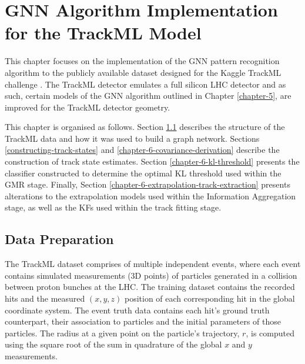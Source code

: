 


\chapter{GNN Algorithm Implementation for the TrackML Model}
\label{chapter-6}

This chapter focuses on the implementation of the GNN pattern recognition algorithm to the publicly available dataset designed for the Kaggle TrackML challenge \cite{kaggle-trackml}. The TrackML detector emulates a full silicon LHC detector and as such, certain models of the GNN algorithm outlined in Chapter \ref{chapter-5}, are improved for the TrackML detector geometry.

This chapter is organised as follows. Section \ref{chapter-6-data-prep} describes the structure of the TrackML data and how it was used to build a graph network. Sections \ref{constructing-track-states} and \ref{chapter-6-covariance-derivation} describe the construction of track state estimates. Section \ref{chapter-6-kl-threshold} presents the classifier constructed to determine the optimal KL threshold used within the GMR stage. Finally, Section \ref{chapter-6-extrapolation-track-extraction} presents alterations to the extrapolation models used within the Information Aggregation stage, as well as the KFs used within the track fitting stage. 
 


\section{Data Preparation}
\label{chapter-6-data-prep}

The TrackML dataset \cite{kaggle-trackml-data} comprises of multiple independent events, where each event contains simulated measurements (3D points) of particles generated in a collision between proton bunches at the LHC. The training dataset contains the recorded hits and the measured $(x, y, z)$ position of each corresponding hit in the global coordinate system. The event truth data contains each hit's ground truth counterpart, their association to particles and the initial parameters of those particles. The radius at a given point on the particle's trajectory, $r$, is computed using the square root of the sum in quadrature of the global $x$ and $y$ measurements.

